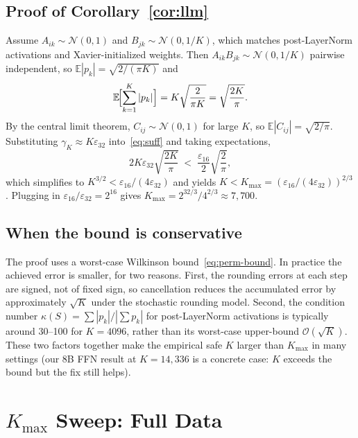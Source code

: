 \documentclass{article}
\begin{document}
\subsection*{Proof of Corollary~\ref{cor:llm}}
Assume $A_{ik}\sim\mathcal N(0,1)$ and $B_{jk}\sim\mathcal N(0,1/K)$, which matches
post-LayerNorm activations and Xavier-initialized weights. Then
$A_{ik}B_{jk}\sim\mathcal N(0,1/K)$ pairwise independent, so
$\mathbb E|p_k|=\sqrt{2/(\pi K)}$ and
\begin{equation}
\mathbb E\!\Bigl[\sum_{k=1}^{K}|p_k|\Bigr] = K\sqrt{\frac{2}{\pi K}} = \sqrt{\frac{2K}{\pi}}.
\label{eq:expected-l1}
\end{equation}
By the central limit theorem, $C_{ij}\!\sim\!\mathcal N(0,1)$ for large $K$, so
$\mathbb E|C_{ij}|\!=\!\sqrt{2/\pi}$. Substituting $\gamma_K\!\approx\!K\varepsilon_{32}$
into~\eqref{eq:suff} and taking expectations,
\begin{equation}
2K\varepsilon_{32}\sqrt{\frac{2K}{\pi}} \;<\; \frac{\varepsilon_{16}}{2}\sqrt{\frac{2}{\pi}},
\label{eq:expected-suff}
\end{equation}
which simplifies to $K^{3/2}\!<\!\varepsilon_{16}/(4\varepsilon_{32})$ and yields
$K<K_{\max}=(\varepsilon_{16}/(4\varepsilon_{32}))^{2/3}$.
Plugging in $\varepsilon_{16}/\varepsilon_{32}=2^{16}$ gives
$K_{\max}=2^{32/3}/4^{2/3}\approx7{,}700$.

\subsection*{When the bound is conservative}
The proof uses a worst-case Wilkinson bound~\eqref{eq:perm-bound}. In practice the
achieved error is smaller, for two reasons. First, the rounding errors at each
step are signed, not of fixed sign, so cancellation reduces the accumulated error
by approximately $\sqrt{K}$ under the stochastic rounding model. Second, the
condition number $\kappa(S)=\sum|p_k|/|\sum p_k|$ for post-LayerNorm activations
is typically around 30--100 for $K\!=\!4096$, rather than its worst-case
upper-bound $\mathcal O(\sqrt K)$. These two factors together make the empirical
safe $K$ larger than $K_{\max}$ in many settings (our 8B FFN result at
$K=14{,}336$ is a concrete case: $K$ exceeds the bound but the fix still helps).

\section{$K_{\max}$ Sweep: Full Data}
\label{app:kmax}
\end{document}
